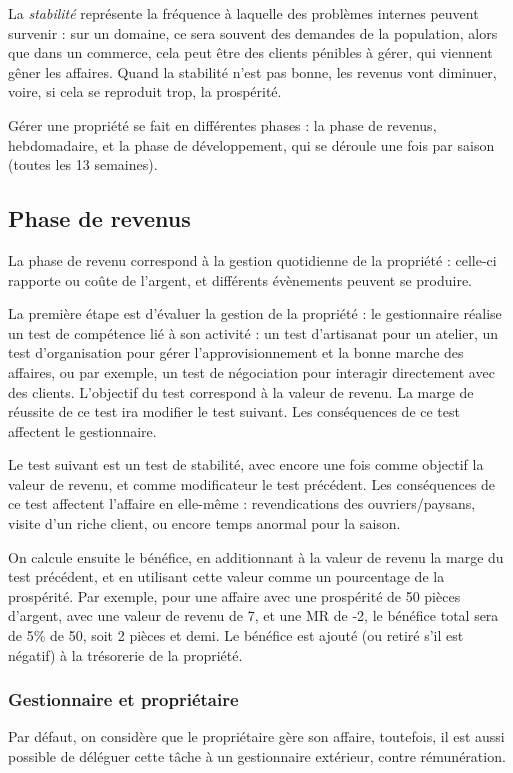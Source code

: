 \documentclass[10pt,a4paper]{book}
\begin{document}
La \emph{stabilité} représente la fréquence à laquelle des problèmes internes peuvent survenir : sur un domaine, ce sera souvent des demandes de la population, alors que dans un commerce, cela peut être des clients pénibles à gérer, qui viennent gêner les affaires. Quand la stabilité n'est pas bonne, les revenus vont diminuer, voire, si cela se reproduit trop, la prospérité.

Gérer une propriété se fait en différentes phases : la phase de revenus, hebdomadaire, et la phase de développement, qui se déroule une fois par saison (toutes les 13 semaines). 

\subsection{Phase de revenus}
La phase de revenu correspond à la gestion quotidienne de la propriété : celle-ci rapporte ou coûte de l'argent, et différents évènements peuvent se produire.

La première étape est d'évaluer la gestion de la propriété : le gestionnaire réalise un test de compétence lié à son activité : un test d'artisanat pour un atelier, un test d'organisation pour gérer l'approvisionnement et la bonne marche des affaires, ou par exemple, un test de négociation pour interagir directement avec des clients. L'objectif du test correspond à la valeur de revenu. La marge de réussite de ce test ira modifier le test suivant. Les conséquences de ce test affectent le gestionnaire.

Le test suivant est un test de stabilité, avec encore une fois comme objectif la valeur de revenu, et comme modificateur le test précédent. Les conséquences de ce test affectent l'affaire en elle-même : revendications des ouvriers/paysans, visite d'un riche client, ou encore temps anormal pour la saison.

On calcule ensuite le bénéfice, en additionnant à la valeur de revenu la marge du test précédent, et en utilisant cette valeur comme un pourcentage de la prospérité. Par exemple, pour une affaire avec une prospérité de 50 pièces d'argent, avec une valeur de revenu de 7, et une MR de -2, le bénéfice total sera de 5\% de 50, soit 2 pièces et demi. Le bénéfice est ajouté (ou retiré s'il est négatif) à la trésorerie de la propriété.
\subsubsection{Gestionnaire et propriétaire}
Par défaut, on considère que le propriétaire gère son affaire, toutefois, il est aussi possible de déléguer cette tâche à un gestionnaire extérieur, contre rémunération. 
\end{document}
